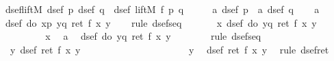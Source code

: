 \begin{isabellebody}
\isamarkuptrue%
\ dsef{\isacharunderscore}liftM{}{\isacharcolon}\ {\isachardoublequote}{\isasymlbrakk}dsef\ p{\isacharsemicolon}\ dsef\ q{\isasymrbrakk}\ {\isasymLongrightarrow}\ dsef\ {\isacharparenleft}liftM{}\ f\ p\ q{\isacharparenright}{\isachardoublequote}\isanewline
\isamarkupfalse%
\ {\isacharminus}\isanewline
\ \ \isamarkupfalse%
\ a{}{\isacharcolon}\ {\isachardoublequote}dsef\ p{\isachardoublequote}\ \ a{}{\isacharcolon}\ {\isachardoublequote}dsef\ q{\isachardoublequote}\isanewline
\ \ \isamarkupfalse%
\ a{}\ \isamarkupfalse%
\ {\isachardoublequote}dsef\ {\isacharparenleft}do\ {\isacharbraceleft}x{\isasymleftarrow}p{\isacharsemicolon}\ y{\isasymleftarrow}q{\isacharsemicolon}\ ret\ {\isacharparenleft}f\ x\ y{\isacharparenright}{\isacharbraceright}{\isacharparenright}{\isachardoublequote}\isanewline
\ \ \isamarkupfalse%
\ {\isacharparenleft}rule\ dsef{\isacharunderscore}seq{\isacharparenright}\isanewline
\ \ \ \ \isamarkupfalse%
\ {\isachardoublequote}\ {\isasymforall}x{\isachardot}\ dsef\ {\isacharparenleft}do\ {\isacharbraceleft}y{\isasymleftarrow}q{\isacharsemicolon}\ ret\ {\isacharparenleft}f\ x\ y{\isacharparenright}{\isacharbraceright}{\isacharparenright}{\isachardoublequote}\isanewline
\ \ \ \ \isamarkupfalse%
\ \isanewline
\ \ \ \ \ \ \isamarkupfalse%
\ x\ \isamarkupfalse%
\ a{}\ \isamarkupfalse%
\ {\isachardoublequote}dsef\ {\isacharparenleft}do\ {\isacharbraceleft}y{\isasymleftarrow}q{\isacharsemicolon}\ ret\ {\isacharparenleft}f\ x\ y{\isacharparenright}{\isacharbraceright}{\isacharparenright}{\isachardoublequote}\isanewline
\ \ \ \ \ \ \isamarkupfalse%
\ {\isacharparenleft}rule\ dsef{\isacharunderscore}seq{\isacharparenright}\isanewline
\ \ \ \ \ \ \ \ \isamarkupfalse%
\ {\isachardoublequote}\ {\isasymforall}y{\isachardot}\ dsef\ {\isacharparenleft}ret\ {\isacharparenleft}f\ x\ y{\isacharparenright}{\isacharparenright}{\isachardoublequote}\isanewline
\ \ \ \ \ \ \ \ \isamarkupfalse%
\ \isanewline
\ \ \ \ \ \ \ \ \ \ \isamarkupfalse%
\ y\ \isamarkupfalse%
\ {\isachardoublequote}dsef\ {\isacharparenleft}ret\ {\isacharparenleft}f\ x\ y{\isacharparenright}{\isacharparenright}{\isachardoublequote}\ \isamarkupfalse%
\ {\isacharparenleft}rule\ dsef{\isacharunderscore}ret{\isacharparenright}\isanewline

\end{isabellebody}
